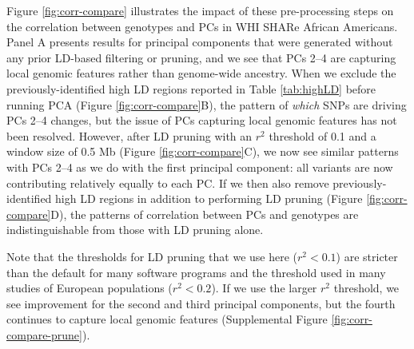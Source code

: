 \documentclass[12pt]{article}
\begin{document}
Figure \ref{fig:corr-compare} illustrates the impact of these pre-processing steps on the correlation between genotypes and PCs in WHI SHARe African Americans. 
Panel A presents results for principal components that were generated without any prior LD-based filtering or pruning, and we see that PCs 2--4 are capturing local genomic features rather than genome-wide ancestry.
When we exclude the previously-identified high LD regions reported in Table \ref{tab:highLD} before running PCA (Figure \ref{fig:corr-compare}B), the pattern of \textit{which} SNPs are driving PCs 2--4 changes, but the issue of PCs capturing local genomic features has not been resolved. 
However, after LD pruning with an $r^2$ threshold of 0.1 and a window size of 0.5 Mb (Figure \ref{fig:corr-compare}C), we now see similar patterns with PCs 2--4 as we do with the first principal component: all variants are now contributing relatively equally to each PC. 
If we then also remove previously-identified high LD regions in addition to performing LD pruning (Figure \ref{fig:corr-compare}D), the patterns of correlation between PCs and genotypes are indistinguishable from those with LD pruning alone. 

Note that the thresholds for LD pruning that we use here ($r^2 < 0.1$) are stricter than the default for many software programs and the threshold used in many studies of European populations ($r^2 < 0.2$).
If we use the larger $r^2$ threshold, we see improvement for the second and third principal components, but the fourth continues to capture local genomic features (Supplemental Figure \ref{fig:corr-compare-prune}). 
\end{document}
